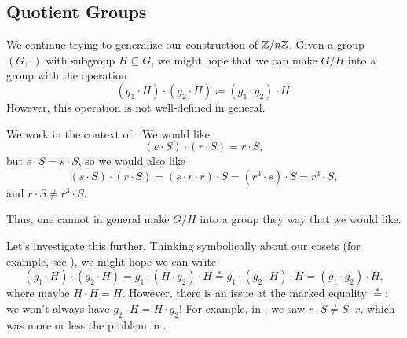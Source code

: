 \documentclass[../main.tex]{subfiles}
\begin{document}
\subsection{Quotient Groups}
We continue trying to generalize our construction of $\mathbb Z/n\mathbb Z$. Given a group $(G,\cdot)$ with subgroup $H\subseteq G$, we might hope that we can make $G/H$ into a group with the operation
\[(g_1\cdot H)\cdot(g_2\cdot H)\coloneqq(g_1\cdot g_2)\cdot H.\]
However, this operation is not well-defined in general.
\begin{example} \label{ex:bad-quotient}
    We work in the context of . We would like
    \[(e\cdot S)\cdot(r\cdot S)=r\cdot S,\]
    but $e\cdot S=s\cdot S$, so we would also like
    \[(s\cdot S)\cdot(r\cdot S)=(s\cdot r\cdot r)\cdot S=\left(r^3\cdot s\right)\cdot S=r^3\cdot S,\]
    and $r\cdot S\ne r^3\cdot S$.
\end{example}
Thus, one cannot in general make $G/H$ into a group they way that we would like.

Let's investigate this further. Thinking symbolically about our cosets (for example, see ), we might hope we can write
\begin{equation}
    (g_1\cdot H)\cdot(g_2\cdot H)=g_1\cdot(H\cdot g_2)\cdot H\stackrel*=g_1\cdot(g_2\cdot H)\cdot H=(g_1\cdot g_2)\cdot H, \label{eq:pipe-dream-normal-subgroup}
\end{equation}
where maybe $H\cdot H=H$. However, there is an issue at the marked equality $\stackrel*=$: we won't always have $g_2\cdot H=H\cdot g_2$! For example, in , we saw $r\cdot S\ne S\cdot r$, which was more or less the problem in .
\end{document}
